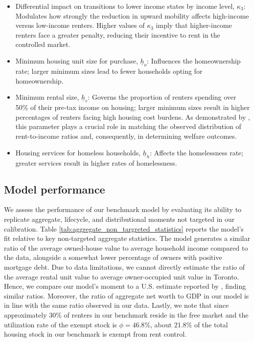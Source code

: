 \documentclass[parskip=full]{article}
\begin{document}
\begin{itemize}
    \item Differential impact on transitions to lower income states by income level, $\kappa_3$: Modulates how strongly the reduction in upward mobility affects high-income versus low-income renters. Higher values of $\kappa_3$ imply that higher-income renters face a greater penalty, reducing their incentive to rent in the controlled market.
    \item Minimum housing unit size for purchase, $\underline{h}_{o}$: Influences the homeownership rate; larger minimum sizes lead to fewer households opting for homeownership.
    \item Minimum rental size, $\underline{h}_{r}$: Governs the proportion of renters spending over 50\% of their pre-tax income on housing; larger minimum sizes result in higher percentages of renters facing high housing cost burdens. As demonstrated by \citet{rs-2023}, this parameter plays a crucial role in matching the observed distribution of rent-to-income ratios and, consequently, in determining welfare outcomes.
    \item Housing services for homeless households, $\underline{h}_{h}$: Affects the homelessness rate; greater services result in higher rates of homelessness.
\end{itemize}

\subsection{Model performance}\label{sec:non_targeted_statistics}

We assess the performance of our benchmark model by evaluating its ability to replicate aggregate, lifecycle, and distributional moments not targeted in our calibration. Table \ref{tab:aggregate_non_targreted_statistics} reports the model's fit relative to key non-targeted aggregate statistics. The model generates a similar ratio of the average owned-house value to average household income compared to the data, alongside a somewhat lower percentage of owners with positive mortgage debt. Due to data limitations, we cannot directly estimate the ratio of the average rental unit value to average owner-occupied unit value in Toronto. Hence, we compare our model's moment to a U.S. estimate reported by \citet{chatterjee-eyigungor-2015}, finding similar ratios. Moreover, the ratio of aggregate net worth to GDP in our model is in line with the same ratio observed in our data. Lastly, we note that since approximately 30\% of renters in our benchmark reside in the free market and the utilization rate of the exempt stock is $\phi=46.8\%$, about 21.8\% of the total housing stock in our benchmark is exempt from rent control.
\end{document}
